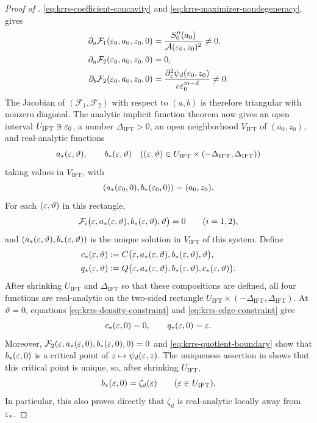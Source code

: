 \begin{proof}[Proof of ]
\eqref{eq:krrs-coefficient-concavity} and \eqref{eq:krrs-maximizer-nondegeneracy}, gives
\begin{align}
  \partial_a\mathcal F_1(\varepsilon_0,a_0,z_0,0)
  &=\frac{S_0''(a_0)}{\mathcal A(\varepsilon_0,z_0)^2}\ne0,
    \label{eq:krrs-jacobian-aa}\\
  \partial_a\mathcal F_2(\varepsilon_0,a_0,z_0,0)
  &=0,
    \label{eq:krrs-jacobian-ba}\\
  \partial_b\mathcal F_2(\varepsilon_0,a_0,z_0,0)
  &=\frac{\partial_z^2\psi_d(\varepsilon_0,z_0)}
          {v\varepsilon_0^{m-d}}\ne0.
    \label{eq:krrs-jacobian-bb}
\end{align}
The Jacobian of \((\mathcal F_1,\mathcal F_2)\) with respect to \((a,b)\)
is therefore triangular with nonzero diagonal.  The analytic implicit
function theorem now gives an open interval \(U_{\mathrm{IFT}}\ni\varepsilon_0\),
a number \(\Delta_{\mathrm{IFT}}>0\), an open neighborhood
\(V_{\mathrm{IFT}}\) of \((a_0,z_0)\), and real-analytic functions
\begin{equation}\label{eq:krrs-stationary-densities}
  a_*(\varepsilon,\vartheta),\qquad b_*(\varepsilon,\vartheta)
  \quad
  ((\varepsilon,\vartheta)\in
    U_{\mathrm{IFT}}\times(-\Delta_{\mathrm{IFT}},
                             \Delta_{\mathrm{IFT}}))
\end{equation}
taking values in \(V_{\mathrm{IFT}}\), with
\[
  (a_*(\varepsilon_0,0),b_*(\varepsilon_0,0))=(a_0,z_0).
\]
For each \((\varepsilon,\vartheta)\) in this rectangle,
\[
  \mathcal F_i\bigl(\varepsilon,a_*(\varepsilon,\vartheta),
    b_*(\varepsilon,\vartheta),\vartheta\bigr)=0
  \qquad(i=1,2),
\]
and \((a_*(\varepsilon,\vartheta),b_*(\varepsilon,\vartheta))\) is the unique solution in
\(V_{\mathrm{IFT}}\) of this system.  Define
\begin{align}
  c_*(\varepsilon,\vartheta)
  &:=C\bigl(\varepsilon,a_*(\varepsilon,\vartheta),
                 b_*(\varepsilon,\vartheta),\vartheta\bigr),\label{eq:krrs-block-size-map}\\
  q_*(\varepsilon,\vartheta)
  &:=Q\bigl(\varepsilon,a_*(\varepsilon,\vartheta),
                 b_*(\varepsilon,\vartheta),c_*(\varepsilon,\vartheta)\bigr).
                 \label{eq:krrs-large-block-map}
\end{align}
After shrinking \(U_{\mathrm{IFT}}\) and \(\Delta_{\mathrm{IFT}}\) so that
these compositions are defined, all four functions are real-analytic on the
two-sided rectangle
\(U_{\mathrm{IFT}}\times(-\Delta_{\mathrm{IFT}},\Delta_{\mathrm{IFT}})\).
At \(\vartheta=0\), equations \eqref{eq:krrs-density-constraint} and
\eqref{eq:krrs-edge-constraint} give
\[
  c_*(\varepsilon,0)=0,
  \qquad
  q_*(\varepsilon,0)=\varepsilon.
\]
Moreover, \(\mathcal F_2(\varepsilon,a_*(\varepsilon,0),b_*(\varepsilon,0),0)=0\) and
\eqref{eq:krrs-quotient-boundary} show that
\(b_*(\varepsilon,0)\) is a critical point of
\(z\mapsto\psi_d(\varepsilon,z)\).  The uniqueness assertion in
 shows that this critical point is
unique, so, after shrinking \(U_{\mathrm{IFT}}\),
\begin{equation}\label{eq:krrs-cross-block-limit}
  b_*(\varepsilon,0)=\zeta_d(\varepsilon)
  \qquad(\varepsilon\in U_{\mathrm{IFT}}).
\end{equation}
In particular, this also proves directly that \(\zeta_d\) is real-analytic
locally away from \(\varepsilon_*\).


\end{proof}

